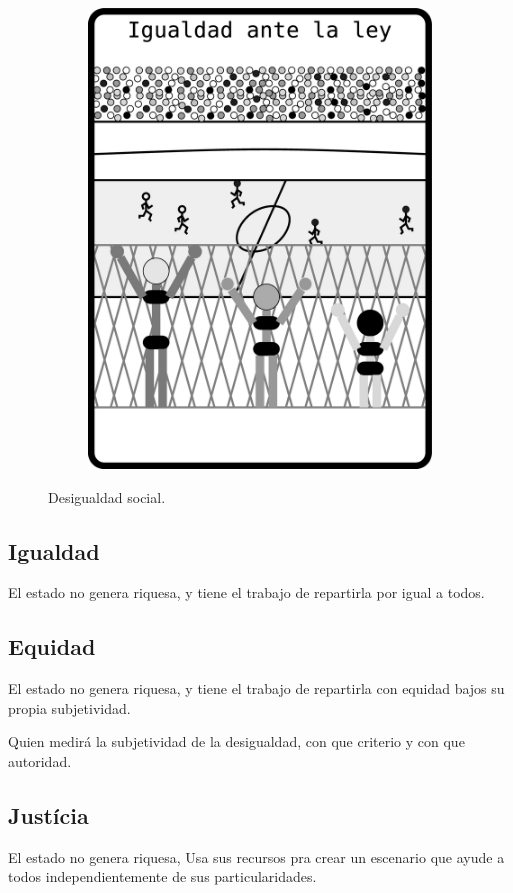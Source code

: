 \begin{figure}[ht!]
\begin{subfigure}{0.3\textwidth}
        \includegraphics[width=\textwidth]{caps/desigualdad/justicia.eps}
        \label{fig:justicia}
    \end{subfigure}
    \caption{Desigualdad social.}\label{fig:DesigualdadSocial}
\end{figure}

\subsection{Igualdad}

El estado no genera riquesa, y tiene el trabajo de repartirla por igual a todos.
\subsection{Equidad}
El estado no genera riquesa, y tiene el trabajo de repartirla con equidad bajos su propia subjetividad.

Quien medirá la subjetividad de la desigualdad, con que criterio y con que autoridad.
\subsection{Justícia}
El estado no genera riquesa, Usa sus recursos pra crear un escenario que ayude a todos
independientemente de sus particularidades.
